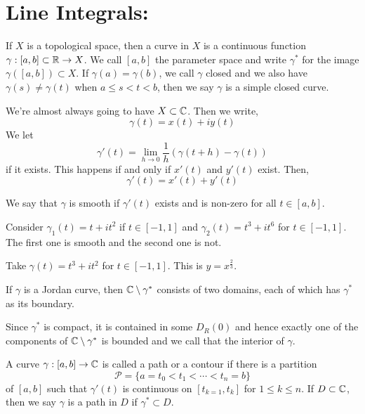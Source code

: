 \documentclass[12pt]{amsart}
\begin{document}
\section{Line Integrals:}

\begin{definition}
    If $X$ is a topological space, then a curve in $X$ is a continuous function $\gamma: [a, b] \subset \mathbb R \to X$. We call $[a,b]$ the parameter space and write $\gamma^*$ for the image $\gamma([a,b]) \subset X$. If $\gamma(a) = \gamma(b)$, we call $\gamma$ closed and we also have $\gamma(s) \neq \gamma(t)$ when $a \leq s < t < b$, then we say $\gamma$ is a simple closed curve. 
\end{definition}

We're almost always going to have $X \subset \mathbb C$. Then we write, 
\[ \gamma(t) = x(t) + iy(t) \]
We let
\[ \gamma'(t) = \lim_{h \to 0} \frac{1}{h} (\gamma(t+h)-\gamma(t))\]
if it exists. This happens if and only if $x'(t)$ and $y'(t)$ exist. Then, 
\[ \gamma'(t) = x'(t) + y'(t) \]

We say that $\gamma$ is smooth if $\gamma'(t)$ exists and is non-zero for all $t \in [a,b]$. 

\begin{example}
    Consider $\gamma_1(t) = t+it^2$ if $t \in [-1, 1]$ and $\gamma_2(t) = t^3+it^6$ for $t \in [-1, 1]$. The first one is smooth and the second one is not. 
\end{example}

\begin{example}
    Take $\gamma(t) = t^3 + it^2$ for $t \in [-1,1]$. This is $y = x^{\frac{2}{3}}$. 
\end{example}

\begin{theorem}
    If $\gamma$ is a Jordan curve, then $\mathbb C \setminus \gamma^*$ consists of two domains, each of which has $\gamma^*$ as its boundary. 
\end{theorem}

\begin{remark}
    Since $\gamma^*$ is compact, it is contained in some $D_R(0)$ and hence exactly one of the components of $\mathbb C \setminus \gamma^*$ is bounded and we call that the interior of $\gamma$. 
\end{remark}

\begin{definition}
    A curve $\gamma: [a,b] \to \mathbb C$ is called a path or a contour if there is a partition 
    \[ \mathcal P = \{ a = t_0 < t_1 < \cdots < t_n = b\}\]
    of $[a,b]$ such that $\gamma'(t)$ is continuous on $[t_{k=1}, t_k]$ for $1 \leq k \leq n$. If $D \subset \mathbb C$, then we say $\gamma$ is a path in $D$ if $\gamma^* \subset D$. 
\end{definition}
\end{document}
